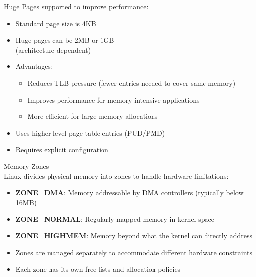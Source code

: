 \begin{definition}{Huge Pages} supported to improve performance:
    \begin{itemize}
        \item Standard page size is 4KB
        \item Huge pages can be 2MB or 1GB \\(architecture-dependent)
        \item Advantages:
            \begin{itemize}
                \item Reduces TLB pressure (fewer entries needed to cover same memory)
                \item Improves performance for memory-intensive applications
                \item More efficient for large memory allocations
            \end{itemize}
        \item Uses higher-level page table entries (PUD/PMD)
        \item Requires explicit configuration
    \end{itemize}
\end{definition}

\multend

\begin{concept}{Memory Zones}\\
    Linux divides physical memory into zones to handle hardware limitations:
    \begin{itemize}
        \item \textbf{ZONE\_DMA}: Memory addressable by DMA controllers (typically below 16MB)
        \item \textbf{ZONE\_NORMAL}: Regularly mapped memory in kernel space
        \item \textbf{ZONE\_HIGHMEM}: Memory beyond what the kernel can directly address
        \item Zones are managed separately to accommodate different hardware constraints
        \item Each zone has its own free lists and allocation policies
    \end{itemize}
\end{concept}

